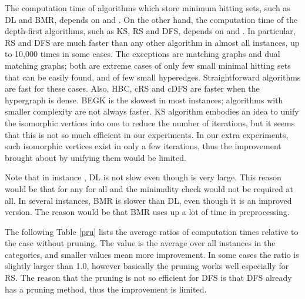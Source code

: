 The computation time of algorithms which store minimum hitting sets, such
 as DL and BMR, depends on  and .
On the other hand, the computation time of the depth-first algorithms,
 such as KS, RS and DFS, depends on  and .
In particular, RS and DFS are much faster than any other algorithm in
 almost all instances, up to 10,000 times in some cases.
The exceptions are matching graphs and dual matching graphs; both are 
extreme cases of only few small minimal hitting sets that can be
 easily found, and of few small hyperedges.
Straightforward algorithms are fast for these cases.
Also, HBC, cRS and cDFS are faster when the hypergraph is dense.
BEGK is the slowest in most instances; algorithms with smaller complexity
 are not always faster.
KS algorithm embodies an idea to unify the isomorphic vertices into
 one to reduce the number of iterations, but it seems that this is 
 not so much efficient in our experiments.
In our extra experiments, such isomorphic vertices exist in only a few
 iterations, thus the improvement brought about by unifying them would be
 limited.

Note that in instance , DL is not slow even though 
 is very large.
This reason would be that for any  for all  and
 the minimality check would not be required at all.
In several instances, BMR is slower than DL, even though it is an improved
 version.
The reason would be that BMR uses up a lot of time in preprocessing.

The following Table \ref{pru} lists the average ratios of computation
 times relative to the case without pruning.
The value is the average over all instances in the categories, and smaller
 values mean more improvement.
In some cases the ratio is slightly larger than 1.0, however basically 
 the pruning works well especially for RS.
The reason that the pruning is not so efficient for DFS is that DFS already
 has a pruning method, thus the improvement is limited.

